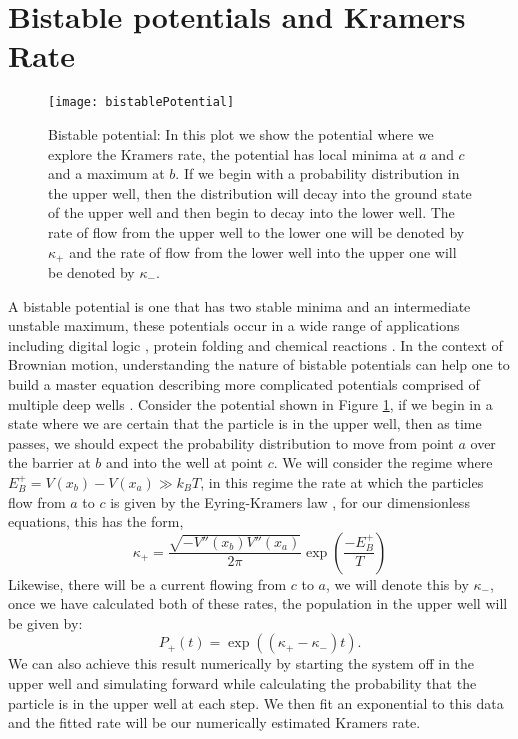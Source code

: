 \section{Bistable potentials and Kramers Rate} \label{Kramers}

\begin{figure}[tb]
\texttt{[image: bistablePotential]}
\caption{Bistable potential: In this plot we show the potential where we explore the Kramers rate, the potential has local minima at $a$ and $c$ and a maximum at $b$. If we begin with a probability distribution in the upper well, then the distribution will decay into the ground state of the upper well and then begin to decay into the lower well. The rate of flow from the upper well to the lower one will be denoted by $\kappa_+$ and the rate of flow from the lower well into the upper one will be denoted by $\kappa_-$.}
\label{fig:bistablePotential}
\end{figure}

A bistable potential is one that has two stable minima and an intermediate unstable maximum, these potentials occur in a wide range of applications including digital logic \cite{MyersCelebranoKrishnan2015}, protein folding \cite{BryngelsonWolynes1989} and chemical reactions \cite{BernePecora1976}. In the context of Brownian motion, understanding the nature of bistable potentials can help one to build a master equation describing more complicated potentials comprised of multiple deep wells \cite{Barcilon1996, ChallisJack2014}. Consider the potential shown in Figure \ref{fig:bistablePotential}, if we begin in a state where we are certain that the particle is in the upper well, then as time passes, we should expect the probability distribution to move from point $a$ over the barrier at $b$ and into the well at point $c$. We will consider the regime where $E^+_B = V(x_b) - V(x_a) \gg k_B T$, in this regime the rate at which the particles flow from $a$ to $c$ is given by the Eyring-Kramers law \cite{Eyring1935, Kramers1940}, for our dimensionless equations, this has the form,
\begin{equation}
\kappa_+ = \frac{\sqrt{-V''(x_b) V''(x_a)}}{2 \pi} \exp \left({\frac{-E^+_B}{T}} \right)
\end{equation}
Likewise, there will be a current flowing from $c$ to $a$, we will denote this by $\kappa_-$, once we have calculated both of these rates, the population in the upper well will be given by:
\begin{equation}
P_+(t) = \exp{((\kappa_+ - \kappa_- )t)}.
\end{equation}
We can also achieve this result numerically by starting the system off in the upper well and simulating forward while calculating the probability that the particle is in the upper well at each step. We then fit an exponential to this data and the fitted rate will be our numerically estimated Kramers rate.
